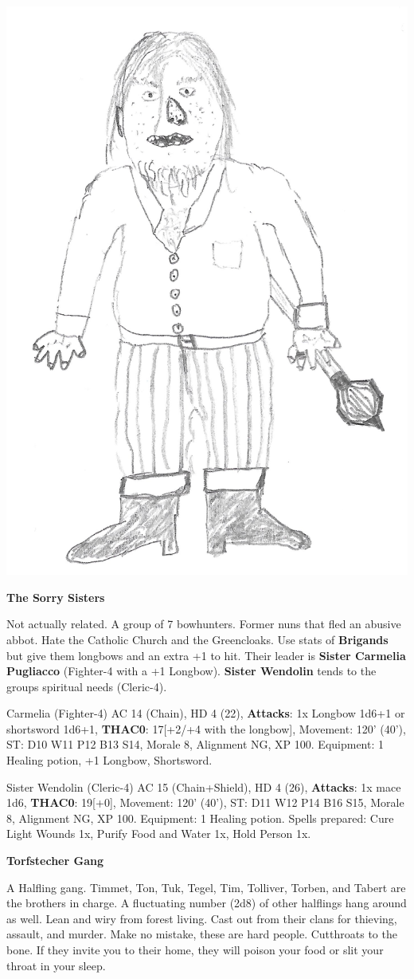 \documentclass[
]{book}
\begin{document}
\begin{center}\includegraphics[width=0.5\linewidth]{graphics/rotbart1} \end{center}

\textbf{The Sorry Sisters}

Not actually related. A group of 7 bowhunters. Former nuns that fled an abusive abbot. Hate the Catholic Church and the Greencloaks. Use stats of \textbf{Brigands} but give them longbows and an extra +1 to hit. Their leader is \textbf{Sister Carmelia Pugliacco} (Fighter-4 with a +1 Longbow). \textbf{Sister Wendolin} tends to the groups spiritual needs (Cleric-4).

Carmelia (Fighter-4) AC 14 (Chain), HD 4 (22), \textbf{Attacks}: 1x Longbow 1d6+1 or shortsword 1d6+1, \textbf{THAC0}: 17{[}+2/+4 with the longbow{]}, Movement: 120' (40'), ST: D10 W11 P12 B13 S14, Morale 8, Alignment NG, XP 100. Equipment: 1 Healing potion, +1 Longbow, Shortsword.

Sister Wendolin (Cleric-4) AC 15 (Chain+Shield), HD 4 (26), \textbf{Attacks}: 1x mace 1d6, \textbf{THAC0}: 19{[}+0{]}, Movement: 120' (40'), ST: D11 W12 P14 B16 S15, Morale 8, Alignment NG, XP 100. Equipment: 1 Healing potion. Spells prepared: Cure Light Wounds 1x, Purify Food and Water 1x, Hold Person 1x.

\textbf{Torfstecher Gang}

A Halfling gang. Timmet, Ton, Tuk, Tegel, Tim, Tolliver, Torben, and Tabert are the brothers in charge. A fluctuating number (2d8) of other halflings hang around as well. Lean and wiry from forest living. Cast out from their clans for thieving, assault, and murder. Make no mistake, these are hard people. Cutthroats to the bone. If they invite you to their home, they will poison your food or slit your throat in your sleep.
\end{document}
